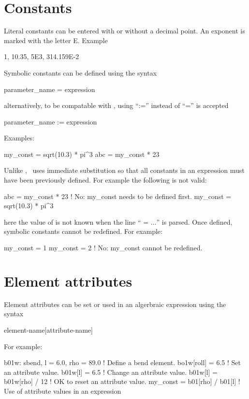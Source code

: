 \section{Constants}

Literal constants can be entered with or without a decimal point. An
exponent is marked with the letter E. Example
\begin{example}
  1, 10.35, 5E3, 314.159E-2
\end{example}
Symbolic constants can be defined using the syntax
\begin{example}
  parameter_name = expression
\end{example}
alternatively, to be compatable with \mad, using ``:='' instead of ``='' is accepted
\begin{example}
  parameter_name := expression
\end{example}
Examples:
\begin{example}
  my_const = sqrt(10.3) * pi^3
  abc      = my_const * 23
\end{example}
Unlike \mad, \bmad\ uses immediate substitution so that all constants
in an expression must have been previously defined. For example the
following is not valid:
\begin{example}
  abc      = my_const * 23      ! No: my_const needs to be defined first.
  my_const = sqrt(10.3) * pi^3
\end{example}
here the value of  is not known when the line ``
= $\ldots$'' is parsed. Once
defined, symbolic constants cannot be redefined. For example:
\begin{example}
  my_const = 1
  my_const = 2  ! No: my_const cannot be redefined.
\end{example}


\section{Element attributes}

Element attributes can be set or used in an algerbraic expression using the syntax
\begin{example}
  element-name[attribute-name]
\end{example}
For example:
\begin{example}
  b01w: sbend, l = 6.0, rho = 89.0   ! Define a bend element.
  bo1w[roll] = 6.5                   ! Set an attribute value.
  b01w[l] = 6.5                      ! Change an attribute value.
  b01w[l] = b01w[rho] / 12           ! OK to reset an attribute value.
  my_const = b01[rho] / b01[l]       ! Use of attribute values in an expression
\end{example}

